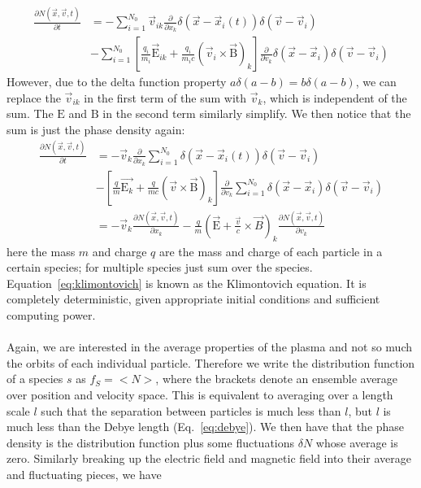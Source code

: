 \begin{align*}
  \frac{\partial N(\vec x,\vec v,t)}{\partial t}&=-\sum_{i=1}^{N_0} \vec v_{ik}\frac{\partial}{\partial x_k} \delta(\vec x-\vec x_i(t))\delta(\vec v-\vec v_i)\\
  &-\sum_{i=1}^{N_0} \left[\frac{q_i}{m_i}\vec{\mathrm{E}}_{ik}+\frac{q_i}{m_i c}(\vec v_i\times\vec{\mathrm{B}})_k\right]\frac{\partial}{\partial v_k}\delta(\vec x-\vec x_i)\delta(\vec v-\vec v_i)
\end{align*}
However, due to the delta function property $a\delta(a-b)=b\delta(a-b)$, we can replace the $\vec v_{ik}$ in the first term of the sum with $\vec v_k$, which is independent of the sum. The $\mathrm{E}$ and $\mathrm{B}$ in the second term similarly simplify. We then notice that the sum is just the phase density again:
\begin{align}
  \frac{\partial N(\vec x,\vec v,t)}{\partial t}&=-\vec v_k\frac{\partial}{\partial x_k}\sum_{i=1}^{N_0} \delta(\vec x-\vec x_i(t))\delta(\vec v-\vec v_i)\nonumber\\
  &- \left[\frac{q}{m}\vec{\mathrm{E}_k}+\frac{q}{m c}(\vec v\times\vec{\mathrm{B}})_k\right]\frac{\partial}{\partial v_k}\sum_{i=1}^{N_0}\delta(\vec x-\vec x_i)\delta(\vec v-\vec v_i)\nonumber\\
  &=-\vec v_k\frac{\partial N(\vec x,\vec v,t)}{\partial x_k}-\frac qm\left(\vec{\mathrm{ E}}+\frac{\vec v}c\times\vec B\right)_k\frac{\partial N(\vec x,\vec v,t)}{\partial v_k}\label{eq:klimontovich}
\end{align}
here the mass $m$ and charge $q$ are the mass and charge of each particle in a certain species; for multiple species just sum over the species. Equation~\ref{eq:klimontovich} is known as the Klimontovich equation. It is completely deterministic, given appropriate initial conditions and sufficient computing power. \\
\\
Again, we are interested in the average properties of the plasma and not so much the orbits of each individual particle. Therefore we write the distribution function of a species $s$ as $f_S=<N>$, where the brackets denote an ensemble average over position and velocity space. This is equivalent to averaging over a length scale $l$ such that the separation between particles is much less than $l$, but $l$ is much less than the Debye length (Eq.~\ref{eq:debye}). We then have that the phase density is the distribution function plus some fluctuations $\delta N$ whose average is zero. Similarly breaking up the electric field and magnetic field into their average and fluctuating pieces, we have
